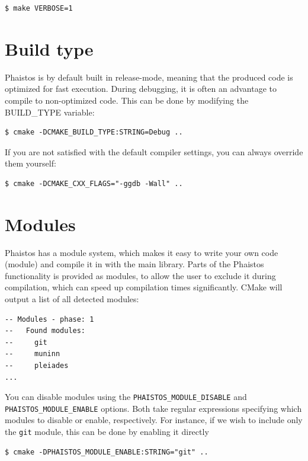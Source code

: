 \documentclass[11pt,a4paper,twoside]{book}
\begin{document}
\begin{verbatim}
$ make VERBOSE=1
\end{verbatim}

\section{Build type}
\label{sec:build-type}

\noindent Phaistos is by default built in release-mode, meaning that
the produced code is optimized for fast execution. During debugging,
it is often an advantage to compile to non-optimized code. This can be
done by modifying the BUILD\_TYPE variable:

\begin{verbatim}
$ cmake -DCMAKE_BUILD_TYPE:STRING=Debug ..
\end{verbatim}

\noindent If you are not satisfied with the default compiler settings,
you can always override them yourself:

\begin{verbatim}
$ cmake -DCMAKE_CXX_FLAGS="-ggdb -Wall" ..
\end{verbatim}

\section{Modules}
\label{sec:modules}

Phaistos has a module system, which makes it easy to write your own
code (module) and compile it in with the main library. Parts of the
Phaistos functionality is provided as modules, to allow the user to
exclude it during compilation, which can speed up compilation times
significantly. CMake will output a list of all detected modules:

\begin{verbatim}
-- Modules - phase: 1
--   Found modules:
--     git
--     muninn
--     pleiades
...
\end{verbatim}

\noindent
You can disable modules using the \texttt{PHAISTOS\_MODULE\_DISABLE}
and \\ \texttt{PHAISTOS\_MODULE\_ENABLE} options. Both take regular
expressions specifying which modules to disable or enable,
respectively. For instance, if we wish to include only the \texttt{git}
module, this can be done by enabling it directly

\begin{verbatim}
$ cmake -DPHAISTOS_MODULE_ENABLE:STRING="git" ..
\end{verbatim}
\end{document}
